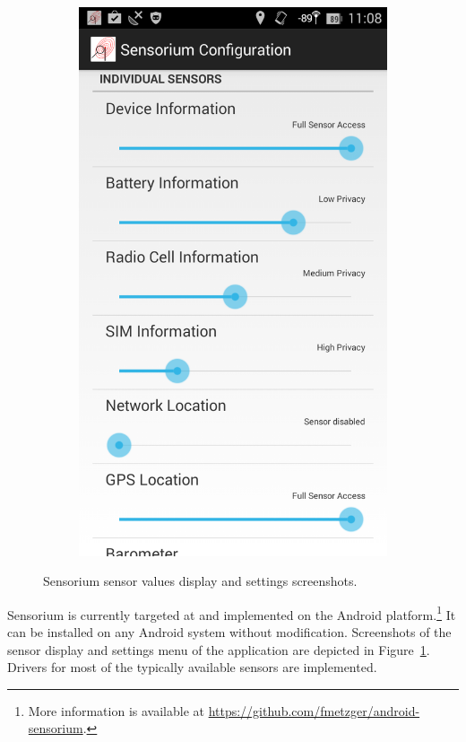 \begin{figure}[htb]
\begin{subfigure}[b]{0.45\textwidth}
		\includegraphics[width=\textwidth]{images/sensorium-settings.png}
	\end{subfigure}%
	\caption{Sensorium sensor values display and settings screenshots.}
\label{c5:fig:sensorium}
\end{figure}

Sensorium is currently targeted at and implemented on the Android platform.\footnote{More information is available at \url{https://github.com/fmetzger/android-sensorium}.} It can be installed on any Android system without modification. Screenshots of the sensor display and settings menu of the application are depicted in Figure~\ref{c5:fig:sensorium}. Drivers for most of the typically available sensors are implemented.

